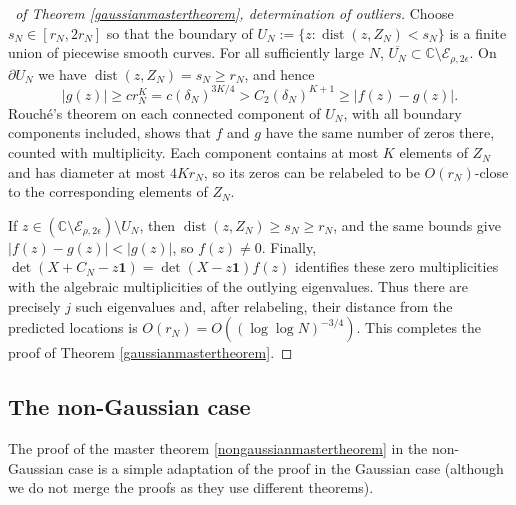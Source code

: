 \documentclass[11pt,reqno]{amsart}
\theoremstyle{plain}
\theoremstyle{remark}
\numberwithin{equation}{section}
\begin{document}
\begin{proof}[\proofname\ of Theorem \ref{gaussianmastertheorem}, determination of outliers]
Choose $s_N\in[r_N,2r_N]$ so that the boundary of
$U_N:=\{z:\operatorname{dist}(z,Z_N)<s_N\}$ is a finite union of piecewise smooth curves. For all sufficiently large $N$, $\overline{U_N}\subset\mathbb{C}\setminus\mathcal{E}_{\rho,2\epsilon}$. On $\partial U_N$ we have $\operatorname{dist}(z,Z_N)=s_N\geq r_N$, and hence
\[
|g(z)|\geq cr_N^K=c(\delta_N)^{3K/4}>
C_2(\delta_N)^{K+1}\geq |f(z)-g(z)|.
\]
Rouché's theorem on each connected component of $U_N$, with all boundary components included, shows that $f$ and $g$ have the same number of zeros there, counted with multiplicity. Each component contains at most $K$ elements of $Z_N$ and has diameter at most $4Kr_N$, so its zeros can be relabeled to be $O(r_N)$-close to the corresponding elements of $Z_N$.

If $z\in(\mathbb{C}\setminus\mathcal{E}_{\rho,2\epsilon})\setminus U_N$, then $\operatorname{dist}(z,Z_N)\geq s_N\geq r_N$, and the same bounds give $|f(z)-g(z)|<|g(z)|$, so $f(z)\neq0$. Finally,
$\det(X+C_N-z\mathbf{1})=\det(X-z\mathbf{1})f(z)$ identifies these zero multiplicities with the algebraic multiplicities of the outlying eigenvalues. Thus there are precisely $j$ such eigenvalues and, after relabeling, their distance from the predicted locations is
$O(r_N)=O((\log\log N)^{-3/4})$. This completes the proof of Theorem \ref{gaussianmastertheorem}.
\end{proof}


\subsection{The non-Gaussian case} The proof of the master theorem \ref{nongaussianmastertheorem} in the non-Gaussian case is a simple adaptation of the proof in the Gaussian case (although we do not merge the proofs as they use different theorems).
\end{document}
